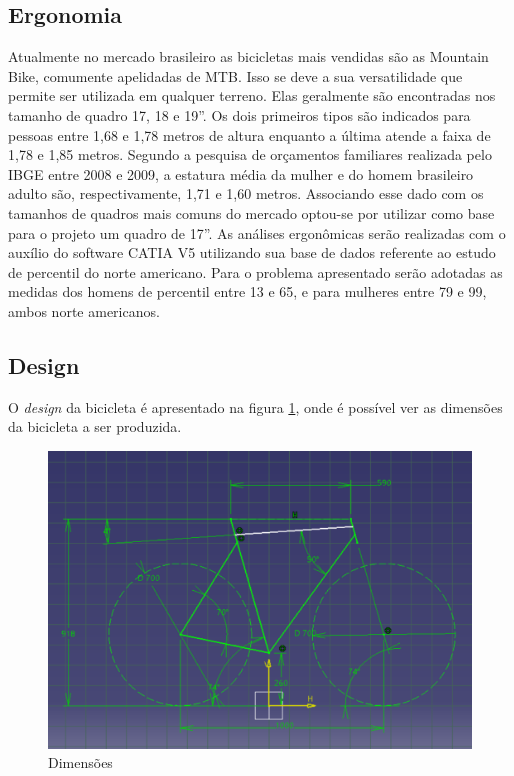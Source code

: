 	\subsection{Ergonomia}
	Atualmente no mercado brasileiro as bicicletas mais vendidas são as Mountain Bike, comumente apelidadas de MTB. Isso se deve a sua versatilidade que permite ser utilizada em qualquer terreno. Elas geralmente são encontradas nos tamanho de quadro 17, 18 e 19”. Os dois primeiros tipos são indicados para pessoas entre 1,68 e 1,78 metros de altura enquanto a última atende a faixa de 1,78 e 1,85 metros. 
Segundo a pesquisa de orçamentos familiares realizada pelo IBGE entre 2008 e 2009, a estatura média da mulher e do homem brasileiro adulto são, respectivamente, 1,71 e 1,60 metros. Associando esse dado com os tamanhos de quadros mais comuns do mercado optou-se por utilizar como base para o projeto um quadro de 17”.  
As análises ergonômicas serão realizadas com o auxílio do software CATIA V5 utilizando sua base de dados referente ao estudo de percentil do norte americano. Para o problema apresentado serão adotadas as medidas dos homens de percentil entre 13 e 65, e para mulheres entre 79 e 99, ambos norte americanos.

	\subsection{Design}

	O \textit{design} da bicicleta é apresentado na figura \ref{img:dimensoes}, onde é possível ver as dimensões da bicicleta a ser produzida.	
	
	\graphicspath{{figuras/}}
	\begin{figure}[h!]
	\centering
	\includegraphics[scale=0.80]{dimensoes.png}
	\caption{Dimensões}
	\label{img:dimensoes}
	\end{figure}

